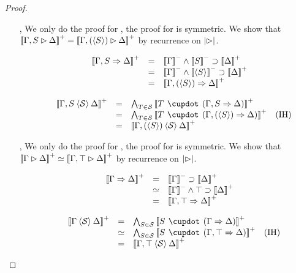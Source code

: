 \begin{proof}
\begin{itemize}
    \item[\rsf{a{-}}, \rsf{a{+}}] We only do the proof for , the proof
    for  is symmetric. We show that $\left\llbracket \Gamma, S \mathbin{\rhd} \Delta \right\rrbracket^+ =
    \left\llbracket \Gamma, (\mathbin{\langle S \rangle}) \mathbin{\rhd} \Delta \right\rrbracket^+$ by recurrence on $\left|\mathbin{\rhd}\right|$.
    \begin{itemize}
      \item[\bcase]
        $$
        \begin{array}{rcll}
          \left\llbracket \Gamma, S \Rightarrow \Delta \right\rrbracket^+
          &=& \left\llbracket \Gamma \right\rrbracket^- \land \left\llbracket S \right\rrbracket^- \supset \left\llbracket \Delta \right\rrbracket^+ & \\
          &=& \left\llbracket \Gamma \right\rrbracket^- \land \left\llbracket \mathbin{\langle S \rangle} \right\rrbracket^- \supset \left\llbracket \Delta \right\rrbracket^+ & \\
          &=& \left\llbracket \Gamma, (\mathbin{\langle S \rangle}) \Rightarrow \Delta \right\rrbracket^+ & \\
        \end{array}
        $$
      \item[\rcase]
        $$
        \begin{array}{rcll}
          \psint{\Gamma, S \piq{\cS} \Delta}
          &=& \psintAndMix{T}{\cS}{\Gamma, S}{\Delta} & \\
          &=& \psintAndMix{T}{\cS}{\Gamma, (\piq{S})}{\Delta} &\text{(IH)} \\
          &=& \psint{\Gamma, (\piq{S}) \piq{\cS} \Delta} & \\
        \end{array}
        $$
    \end{itemize}
    
    \item[\rsf{\top{-}}, \rsf{\bot{+}}]
    We only do the proof for \rsf{\top{-}}, the proof for \rsf{\bot{+}} is
    symmetric. We show that $\left\llbracket \Gamma \mathbin{\rhd} \Delta \right\rrbracket^+ \simeq \left\llbracket \Gamma,
    \top \mathbin{\rhd} \Delta \right\rrbracket^+$ by recurrence on $\left|\mathbin{\rhd}\right|$.
    \begin{itemize}
      \item[\bcase]
      $$
      \begin{array}{rcll}
        \left\llbracket \Gamma \Rightarrow \Delta \right\rrbracket^+
        &=& \left\llbracket \Gamma \right\rrbracket^- \supset \left\llbracket \Delta \right\rrbracket^+ & \\
        &\simeq& \left\llbracket \Gamma \right\rrbracket^- \land \top \supset \left\llbracket \Delta \right\rrbracket^+ & \\
        &=& \left\llbracket \Gamma, \top \Rightarrow \Delta \right\rrbracket^+
      \end{array}
      $$
      \item[\rcase]
      $$
      \begin{array}{rcll}
        \psint{\Gamma \piq{\cS} \Delta}
        &=& \psintAndMix{S}{\cS}{\Gamma}{\Delta} & \\
        &\semequiv& \psintAndMix{S}{\cS}{\Gamma, \top}{\Delta} &\text{(IH)} \\
        &=& \psint{\Gamma, \top \piq{\cS} \Delta} & \\
      \end{array}
      $$
    \end{itemize}


\end{itemize}
\end{proof}

